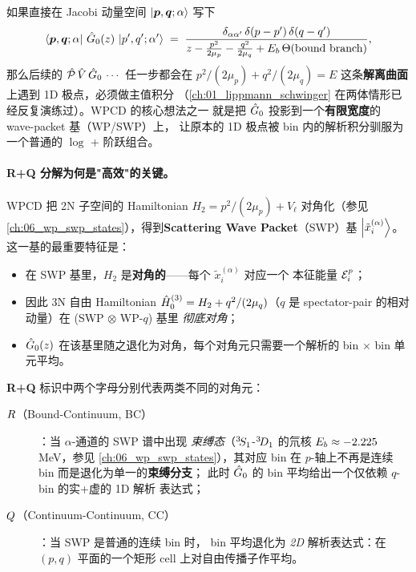 如果直接在 Jacobi 动量空间 \(\ket{\bm{p}, \bm{q}; \alpha}\) 写下
\begin{equation}
\label{eq:ch10-G0-Jacobi}
\bra{\bm{p}, \bm{q}; \alpha}\, \hat{G}_0(z)\, \ket{p', q'; \alpha'}
\;=\;
\frac{\delta_{\alpha\alpha'}\, \delta(p-p')\, \delta(q-q')}
     {z - \frac{p^2}{2\mu_p} - \frac{q^2}{2\mu_q} + E_b\,\Theta(\text{bound branch})},
\end{equation}
那么后续的 \(\hat{\mathcal{P}}\, \hat{V}\, \hat{G}_0\, \cdots\) 任一步都会在 \(p^2/(2\mu_p) +
q^2/(2\mu_q) = E\) 这条\textbf{解离曲面}上遇到 1D 极点，必须做主值积分
（\cref{ch:01_lippmann_schwinger} 在两体情形已经反复演练过）。WPCD 的核心想法之一
就是把 \(\hat{G}_0\) 投影到一个\textbf{有限宽度}的 wave-packet 基（WP/SWP）上，
让原本的 1D 极点被 bin 内的解析积分驯服为一个普通的 \(\log\) + 阶跃组合。

\paragraph{R+Q 分解为何是"高效"的关键。}
WPCD 把 2N 子空间的 Hamiltonian \(H_2 = p^2/(2\mu_p) + V_{\ell}\) 对角化（参见
\cref{ch:06_wp_swp_states}），得到\textbf{Scattering Wave Packet}（SWP）基
\(\ket{\tilde{x}_i^{(\alpha)}}\)。这一基的最重要特征是：

\begin{itemize}
  \item 在 SWP 基里，\(H_2\) 是\textbf{对角的}——每个 \(\tilde{x}_i^{(\alpha)}\) 对应一个
        本征能量 \({\mathcal{E}_{i}^{p}}\)；
  \item 因此 3N 自由 Hamiltonian \(\hat{H}_0^{(3)} = H_2 + q^2/(2\mu_q)\)（\(q\)
        是 spectator-pair 的相对动量）在 (SWP \(\otimes\) WP-\(q\)) 基里
        \emph{彻底对角}；
  \item \(\hat{G}_0(z)\) 在该基里随之退化为对角，每个对角元只需要一个解析的
        bin × bin 单元平均。
\end{itemize}

\textbf{R+Q} 标识中两个字母分别代表两类不同的对角元：

\begin{description}
  \item[\(R\)（Bound-Continuum, BC）]：当 \(\alpha\)-通道的 SWP 谱中出现
        \emph{束缚态}（\({}^{3}\!S_{1}\)-\({}^{3}\!D_{1}\) 的氘核
        \(E_b \approx -2.225\) MeV，参见 \cref{ch:06_wp_swp_states}），其对应
        bin 在 \(p\)-轴上不再是连续 bin 而是退化为单一的\textbf{束缚分支}；
        此时 \(\hat{G}_0\) 的 bin 平均给出一个仅依赖 \(q\)-bin 的实+虚的 1D 解析
        表达式；
  \item[\(Q\)（Continuum-Continuum, CC）]：当 SWP 是普通的连续 bin 时，
        bin 平均退化为 \emph{2D} 解析表达式：在 \((p, q)\) 平面的一个矩形
        cell 上对自由传播子作平均。
\end{description}

